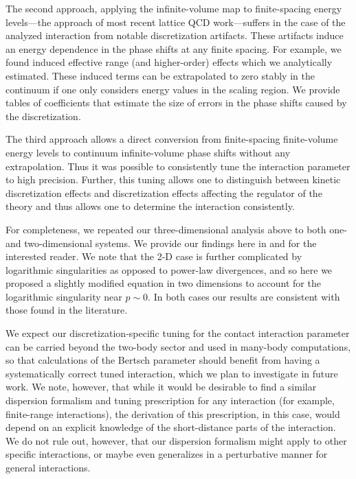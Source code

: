 The second approach, applying the infinite-volume map to finite-spacing energy levels---the approach of most recent lattice QCD work---suffers in the case of the analyzed interaction from notable discretization artifacts.
These artifacts induce an energy dependence in the phase shifts at any finite spacing.
For example, we found induced effective range (and higher-order) effects which we analytically estimated.
These induced terms can be extrapolated to zero stably in the continuum if one only considers energy values in the scaling region.
We provide tables of coefficients that estimate the size of errors in the phase shifts caused by the discretization.

The third approach allows a direct conversion from finite-spacing finite-volume energy levels to continuum infinite-volume phase shifts without any extrapolation.
Thus it was possible to consistently tune the interaction parameter to high precision.
Further, this tuning allows one to distinguish between kinetic discretization effects and discretization effects affecting the regulator of the theory and thus allows one to determine the interaction consistently.

For completeness, we repeated our three-dimensional analysis above to both one- and two-dimensional systems.  We provide our findings here in  and  for the interested reader.
We note that the 2-D case is further complicated by logarithmic singularities as opposed to power-law divergences, and so here we proposed a slightly modified \Luscher equation in two dimensions to account for the logarithmic singularity near $p\sim 0$.
In both cases our results are consistent with those found in the literature.

We expect our discretization-specific tuning for the contact interaction parameter can be carried beyond the two-body sector and used in many-body computations, so that calculations of the Bertsch parameter should benefit from having a systematically correct tuned interaction, which we plan to investigate in future work.
We note, however, that while it would be desirable to find a similar dispersion formalism and tuning prescription for any interaction (for example, finite-range interactions), the derivation of this prescription, in this case, would depend on an explicit knowledge of the short-distance parts of the interaction.
We do not rule out, however, that our dispersion formalism might apply to other specific interactions, or maybe even generalizes in a perturbative manner for general interactions.  %

